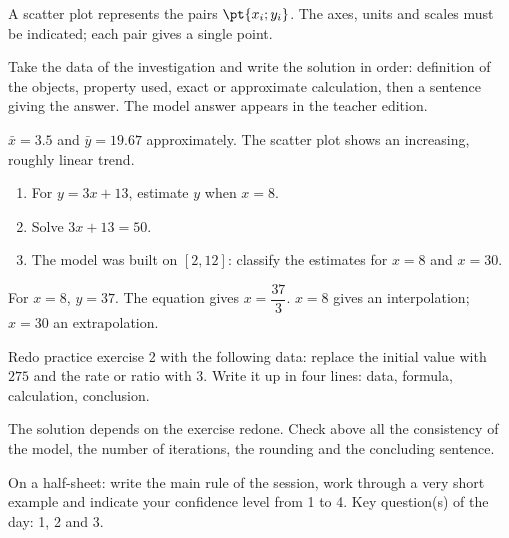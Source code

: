 \begin{summary}A scatter plot represents the pairs $\pt{x_i;y_i}$. The axes, units and scales must be indicated; each pair gives a single point.\end{summary}

\begin{example}
Take the data of the investigation and write the solution in order: definition of the objects, property used, exact or approximate calculation, then a sentence giving the answer. The model answer appears in the teacher edition.
\end{example}
\begin{solution}$\bar x=\num{3,5}$ and $\bar y=\num{19,67}$ approximately. The scatter plot shows an increasing, roughly linear trend.\end{solution}

\begin{exercise}[essential]
\begin{enumerate}\item For $y=3x+13$, estimate $y$ when $x=8$.\item Solve $3x+13=50$.\item The model was built on $[2,12]$: classify the estimates for $x=8$ and $x=30$.\end{enumerate}
\end{exercise}
\begin{solution}For $x=8$, $y=37$. The equation gives $x=\dfrac{37}{3}$. $x=8$ gives an interpolation; $x=30$ an extrapolation.\end{solution}


\begin{homework}Redo practice exercise 2 with the following data: replace the initial value with $275$ and the rate or ratio with $3$. Write it up in four lines: data, formula, calculation, conclusion.\end{homework}
\begin{solution}The solution depends on the exercise redone. Check above all the consistency of the model, the number of iterations, the rounding and the concluding sentence.\end{solution}

\begin{exitticket}[3 minutes]On a half-sheet: write the main rule of the session, work through a very short example and indicate your confidence level from 1 to 4. Key question(s) of the day: 1, 2 and 3.\end{exitticket}

